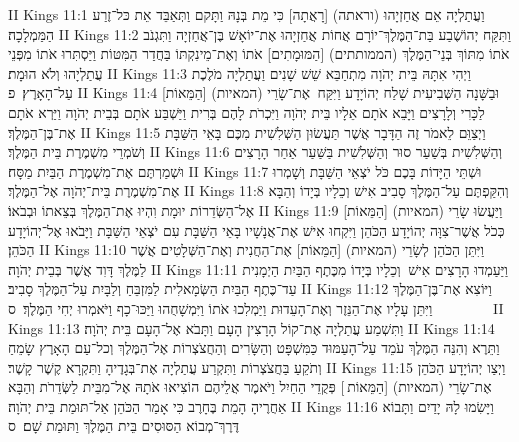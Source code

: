II Kings 11:1	וַעֲתַלְיָה אֵם אֲחַזְיָהוּ (וראתה) [רָאֲתָה] כִּי מֵת בְּנָהּ וַתָּקם וַתְּאַבֵּד אֵת כּל־זֶרַע הַמַּמְלָכָה׃
II Kings 11:2	וַתִּקַּח יְהוֹשֶׁבַע בַּת־הַמֶּלֶךְ־יוֹרָם אֲחוֹת אֲחַזְיָהוּ אֶת־יוֹאָשׁ בֶּן־אֲחַזְיָה וַתִּגְנֹב אֹתוֹ מִתּוֹךְ בְּנֵי־הַמֶּלֶךְ (הממותתים) [הַמּוּמָתִים] אֹתוֹ וְאֶת־מֵינִקְתּוֹ בַּחֲדַר הַמִּטּוֹת וַיַּסְתִּרוּ אֹתוֹ מִפְּנֵי עֲתַלְיָהוּ וְלֹא הוּמָת׃
II Kings 11:3	וַיְהִי אִתָּהּ בֵּית יְהֹוָה מִתְחַבֵּא שֵׁשׁ שָׁנִים וַעֲתַלְיָה מֹלֶכֶת עַל־הָאָרֶץ׃ {פ}
II Kings 11:4	וּבַשָּׁנָה הַשְּׁבִיעִית שָׁלַח יְהוֹיָדָע וַיִּקַּח  אֶת־שָׂרֵי (המאיות) [הַמֵּאוֹת] לַכָּרִי וְלָרָצִים וַיָּבֵא אֹתָם אֵלָיו בֵּית יְהֹוָה וַיִּכְרֹת לָהֶם בְּרִית וַיַּשְׁבַּע אֹתָם בְּבֵית יְהֹוָה וַיַּרְא אֹתָם אֶת־בֶּן־הַמֶּלֶךְ׃
II Kings 11:5	וַיְצַוֵּם לֵאמֹר זֶה הַדָּבָר אֲשֶׁר תַּעֲשׂוּן הַשְּׁלִשִׁית מִכֶּם בָּאֵי הַשַּׁבָּת וְשֹׁמְרֵי מִשְׁמֶרֶת בֵּית הַמֶּלֶךְ׃
II Kings 11:6	וְהַשְּׁלִשִׁית בְּשַׁעַר סוּר וְהַשְּׁלִשִׁית בַּשַּׁעַר אַחַר הָרָצִים וּשְׁמַרְתֶּם אֶת־מִשְׁמֶרֶת הַבַּיִת מַסָּח׃
II Kings 11:7	וּשְׁתֵּי הַיָּדוֹת בָּכֶם כֹּל יֹצְאֵי הַשַּׁבָּת וְשָׁמְרוּ אֶת־מִשְׁמֶרֶת בֵּית־יְהֹוָה אֶל־הַמֶּלֶךְ׃
II Kings 11:8	וְהִקַּפְתֶּם עַל־הַמֶּלֶךְ סָבִיב אִישׁ וְכֵלָיו בְּיָדוֹ וְהַבָּא אֶל־הַשְּׂדֵרוֹת יוּמָת וִהְיוּ אֶת־הַמֶּלֶךְ בְּצֵאתוֹ וּבְבֹאוֹ׃
II Kings 11:9	וַיַּעֲשׂוּ שָׂרֵי (המאיות) [הַמֵּאוֹת] כְּכֹל אֲשֶׁר־צִוָּה יְהוֹיָדָע הַכֹּהֵן וַיִּקְחוּ אִישׁ אֶת־אֲנָשָׁיו בָּאֵי הַשַּׁבָּת עִם יֹצְאֵי הַשַּׁבָּת וַיָּבֹאוּ אֶל־יְהוֹיָדָע הַכֹּהֵן׃
II Kings 11:10	וַיִּתֵּן הַכֹּהֵן לְשָׂרֵי (המאיות) [הַמֵּאוֹת] אֶת־הַחֲנִית וְאֶת־הַשְּׁלָטִים אֲשֶׁר לַמֶּלֶךְ דָּוִד אֲשֶׁר בְּבֵית יְהֹוָה׃
II Kings 11:11	וַיַּעַמְדוּ הָרָצִים אִישׁ  וְכֵלָיו בְּיָדוֹ מִכֶּתֶף הַבַּיִת הַיְמָנִית עַד־כֶּתֶף הַבַּיִת הַשְּׂמָאלִית לַמִּזְבֵּחַ וְלַבָּיִת עַל־הַמֶּלֶךְ סָבִיב׃
II Kings 11:12	וַיּוֹצִא אֶת־בֶּן־הַמֶּלֶךְ וַיִּתֵּן עָלָיו אֶת־הַנֵּזֶר וְאֶת־הָעֵדוּת וַיַּמְלִכוּ אֹתוֹ וַיִּמְשָׁחֻהוּ וַיַּכּוּ־כָף וַיֹּאמְרוּ יְחִי הַמֶּלֶךְ׃ {ס}        
II Kings 11:13	וַתִּשְׁמַע עֲתַלְיָה אֶת־קוֹל הָרָצִין הָעָם וַתָּבֹא אֶל־הָעָם בֵּית יְהֹוָה׃
II Kings 11:14	וַתֵּרֶא וְהִנֵּה הַמֶּלֶךְ עֹמֵד עַל־הָעַמּוּד כַּמִּשְׁפָּט וְהַשָּׂרִים וְהַחֲצֹצְרוֹת אֶל־הַמֶּלֶךְ וְכל־עַם הָאָרֶץ שָׂמֵחַ וְתֹקֵעַ בַּחֲצֹצְרוֹת וַתִּקְרַע עֲתַלְיָה אֶת־בְּגָדֶיהָ וַתִּקְרָא קֶשֶׁר קָשֶׁר׃
II Kings 11:15	וַיְצַו יְהוֹיָדָע הַכֹּהֵן אֶת־שָׂרֵי (המאיות) [הַמֵּאוֹת ] פְּקֻדֵי הַחַיִל וַיֹּאמֶר אֲלֵיהֶם הוֹצִיאוּ אֹתָהּ אֶל־מִבֵּית לַשְּׂדֵרֹת וְהַבָּא אַחֲרֶיהָ הָמֵת בֶּחָרֶב כִּי אָמַר הַכֹּהֵן אַל־תּוּמַת בֵּית יְהֹוָה׃
II Kings 11:16	וַיָּשִׂמוּ לָהּ יָדַיִם וַתָּבוֹא דֶּרֶךְ־מְבוֹא הַסּוּסִים בֵּית הַמֶּלֶךְ וַתּוּמַת שָׁם׃ {ס}        
